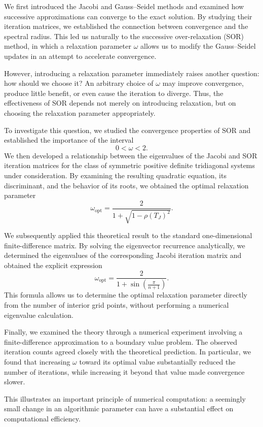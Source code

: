 \documentclass[11pt,a4paper]{article}
\theoremstyle{definition}
\theoremstyle{remark}
\begin{document}
We first introduced the Jacobi and Gauss--Seidel
methods and examined how successive approximations
can converge to the exact solution. By studying
their iteration matrices, we established the
connection between convergence and the spectral
radius. This led us naturally to the successive
over-relaxation (SOR) method, in which a relaxation
parameter $\omega$ allows us to modify the
Gauss--Seidel updates in an attempt to accelerate
convergence.

However, introducing a relaxation parameter
immediately raises another question: how should
we choose it? An arbitrary choice of $\omega$
may improve convergence, produce little benefit,
or even cause the iteration to diverge. Thus,
the effectiveness of SOR depends not merely
on introducing relaxation, but on choosing
the relaxation parameter appropriately.

To investigate this question, we studied the
convergence properties of SOR and established
the importance of the interval
\[
    0<\omega<2.
\]
We then developed a relationship between the
eigenvalues of the Jacobi and SOR iteration
matrices for the class of symmetric positive
definite tridiagonal systems under consideration.
By examining the resulting quadratic equation,
its discriminant, and the behavior of its roots,
we obtained the optimal relaxation parameter
\[
    \boxed{
    \omega_{\mathrm{opt}}
    =
    \frac{2}{
        1+\sqrt{1-\rho(T_J)^2}
    }.
    }
\]

We subsequently applied this theoretical result
to the standard one-dimensional finite-difference
matrix. By solving the eigenvector recurrence
analytically, we determined the eigenvalues of
the corresponding Jacobi iteration matrix and
obtained the explicit expression
\[
    \boxed{
    \omega_{\mathrm{opt}}
    =
    \frac{2}{
        1+\sin\left(\frac{\pi}{n+1}\right)
    }.
    }
\]
This formula allows us to determine the optimal
relaxation parameter directly from the number
of interior grid points, without performing
a numerical eigenvalue calculation.

Finally, we examined the theory through a
numerical experiment involving a finite-difference
approximation to a boundary value problem.
The observed iteration counts agreed closely
with the theoretical prediction. In particular,
we found that increasing $\omega$ toward its
optimal value substantially reduced the number
of iterations, while increasing it beyond that
value made convergence slower.

This illustrates an important principle of
numerical computation: a seemingly small change
in an algorithmic parameter can have a substantial
effect on computational efficiency.
\end{document}
